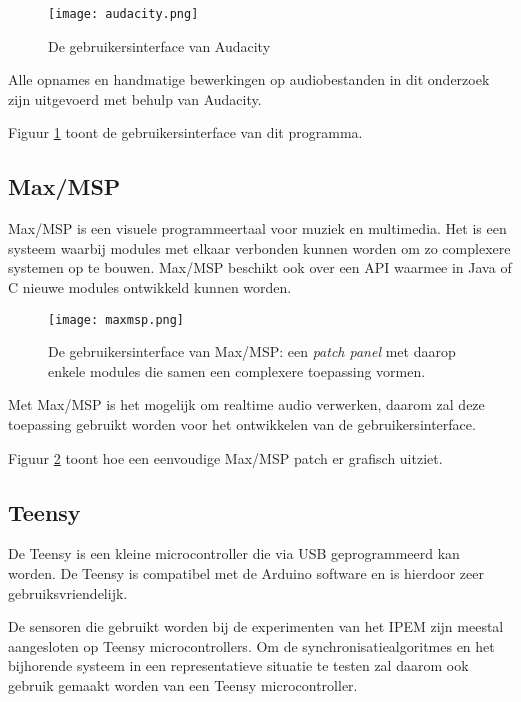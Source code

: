 \begin{figure}[!h]
	\captionsetup{width=0.8\textwidth}
	\caption[Gebruikersinterface van Audacity]{De gebruikersinterface van Audacity}
	\centering
	\advance\parskip0.3cm
	\texttt{[image: audacity.png]}
	\label{screenshot-audacity}
\end{figure}

Alle opnames en handmatige bewerkingen op audiobestanden in dit onderzoek zijn uitgevoerd met behulp van Audacity. 

Figuur \ref{screenshot-audacity} toont de gebruikersinterface van dit programma.

\subsection{Max/MSP}

Max/MSP is een visuele programmeertaal voor muziek en multimedia. Het is een systeem waarbij modules met elkaar verbonden kunnen worden om zo complexere systemen op te bouwen. Max/MSP beschikt ook over een API waarmee in Java of C nieuwe modules ontwikkeld kunnen worden. \cite{cycling2016}

\begin{figure}[!h]
	\captionsetup{width=0.8\textwidth}
	\caption[Gebruikersinterface van Max/MSP]{De gebruikersinterface van Max/MSP: een \textit{patch panel} met daarop enkele modules die samen een complexere toepassing vormen.}
	\centering
	\advance\parskip0.3cm
	\texttt{[image: maxmsp.png]}
	\label{screenshot-max}
\end{figure}

Met Max/MSP is het mogelijk om realtime audio verwerken, daarom zal deze toepassing gebruikt worden voor het ontwikkelen van de gebruikersinterface. 

Figuur \ref{screenshot-max} toont hoe een eenvoudige Max/MSP patch er grafisch uitziet.

\subsection{Teensy}

De Teensy is een kleine microcontroller die via USB geprogrammeerd kan worden. De Teensy is compatibel met de Arduino software en is hierdoor zeer gebruiksvriendelijk. \cite{teensy2016}

De sensoren die gebruikt worden bij de experimenten van het IPEM zijn meestal aangesloten op Teensy microcontrollers.
Om de synchronisatiealgoritmes en het bijhorende systeem in een representatieve situatie te testen zal daarom ook gebruik gemaakt worden van een Teensy microcontroller.

